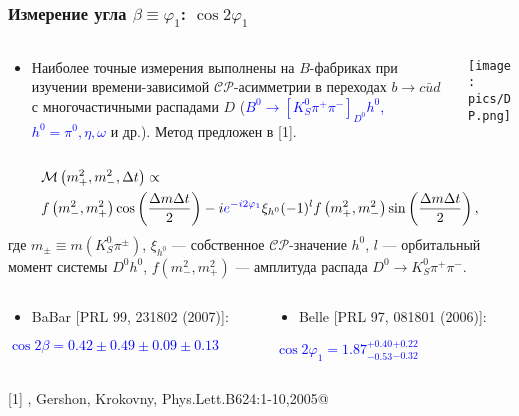 \documentclass[10 pt,compress,mathserif]{beamer}
\newcommand{\cosbeta}{\ensuremath{\cos{2\varphi_1}}\xspace}
\newcommand{\cpconj}{\ensuremath{\mathcal{CP}}\xspace}
\newcommand{\dkspp}{\ensuremath{D^0\to K_S^0\pi^+\pi^-}\xspace}
\begin{document}
\begin{frame}[containsverbatim]
 \frametitle{Измерение угла $\beta\equiv\varphi_1$: \cosbeta}
 \begin{small}

 \begin{columns}
  \begin{column}{0.7\textwidth}
   \begin{itemize}
    \item Наиболее точные измерения выполнены на $B$-фабриках при изучении времени-зависимой \cpconj-асимметрии в переходах $b\to c\bar u d$ с многочастичными распадами $D$ (\textcolor{blue}{$B^0\to [K_S^0\pi^+\pi^-]_{D^0} h^0$, $h^0=\pi^0, \eta, \omega$} и др.). Метод предложен в [1].
 \end{itemize}
  \end{column}
  \begin{column}{0.3\textwidth}
   \texttt{[image: pics/DP.png]}
  \end{column}
 \end{columns}
  
 \begin{equation*}
 \begin{split}
  &\mathcal{M}\left(m_+^2,m_-^2,\Delta t\right) \propto\\
  &f\left(m_-^2,m_+^2\right)\cos\left(\frac{\Delta m\Delta t}{2}\right)-i\textcolor{blue}{e^{-i2\varphi_1}}\xi_{h^0}(-1)^l f\left(m_+^2,m_-^2\right)\sin\left(\frac{\Delta m\Delta t}{2}\right),
 \end{split}
 \end{equation*}
 где $m_{\pm} \equiv m\left(K_S^0\pi^{\pm}\right)$, $\xi_{h^0}$ --- собственное \cpconj-значение $h^0$, $l$ --- орбитальный момент системы $D^0h^0$, $f\left(m_-^2,m_+^2\right)$ --- амплитуда распада \dkspp.
 
 \begin{columns}
  \begin{column}{0.5\textwidth}
    \begin{itemize}
     \item BaBar {\small [PRL 99, 231802 (2007)]}:
    \end{itemize}
   \begin{center}
    \textcolor{blue}{$\cos2\beta = 0.42 \pm 0.49 \pm 0.09 \pm 0.13$}
   \end{center}
  \end{column}
  \begin{column}{0.5\textwidth}
   \begin{itemize}
    \item Belle {\small [PRL 97, 081801 (2006)]}:
   \end{itemize}
   \begin{center}
    \textcolor{blue}{$\cos2\varphi_1 = 1.87^{+0.40}_{-0.53}{}^{+0.22}_{-0.32}$}
   \end{center}
  \end{column}
 \end{columns}

 \vspace{0.4 cm}
 [1] \verb@Bondar, Gershon, Krokovny, Phys.Lett.B624:1-10,2005@
 \end{small}
\end{frame}
\end{document}
